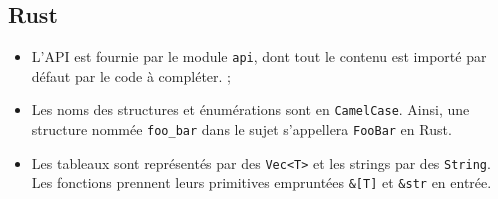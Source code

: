 \subsection{Rust}

\begin{itemize}
\item{L'API est fournie par le module \texttt{api}, dont tout le contenu est
      importé par défaut par le code à compléter. ;}
\item{Les noms des structures et énumérations sont en \texttt{CamelCase}.
      Ainsi, une structure nommée \texttt{foo\_bar} dans le sujet
      s'appellera \texttt{FooBar} en Rust.}
\item{Les tableaux sont représentés par des \texttt{Vec<T>} et les strings par
      des \texttt{String}. Les fonctions prennent leurs primitives empruntées
      \texttt{\&[T]} et \texttt{\&str} en entrée.}
\end{itemize}

